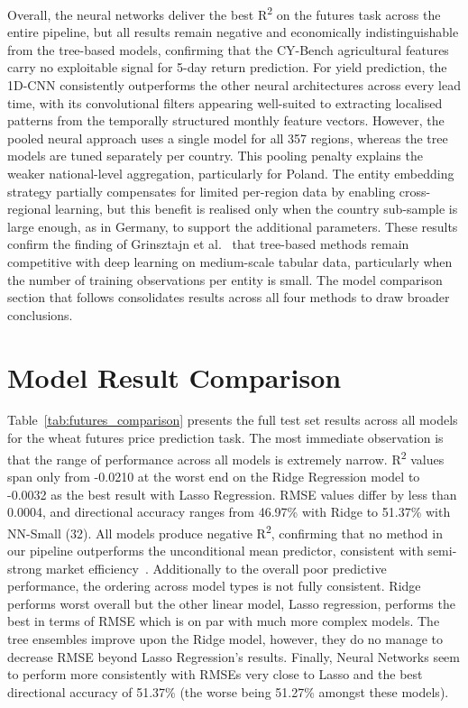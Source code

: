 \documentclass[pdflatex,sn-mathphys-num, oneside, 11pt]{sn-jnl}%
\theoremstyle{thmstyleone}%
\theoremstyle{thmstyletwo}%
\theoremstyle{thmstylethree}%
\begin{document}
Overall, the neural networks deliver the best R\textsuperscript{2} on the futures task across the entire pipeline, but all results remain negative and economically indistinguishable from the tree-based models, confirming that the CY-Bench agricultural features carry no exploitable signal for 5-day return prediction. For yield prediction, the 1D-CNN consistently outperforms the other neural architectures across every lead time, with its convolutional filters appearing well-suited to extracting localised patterns from the temporally structured monthly feature vectors. However, the pooled neural approach uses a single model for all 357 regions, whereas the tree models are tuned separately per country. This pooling penalty explains the weaker national-level aggregation, particularly for Poland. The entity embedding strategy partially compensates for limited per-region data by enabling cross-regional learning, but this benefit is realised only when the country sub-sample is large enough, as in Germany, to support the additional parameters. These results confirm the finding of Grinsztajn et al.~\cite{bib27} that tree-based methods remain competitive with deep learning on medium-scale tabular data, particularly when the number of training observations per entity is small. The model comparison section that follows consolidates results across all four methods to draw broader conclusions.\\

\section{Model Result Comparison}\label{result_comparison}

Table~\ref{tab:futures_comparison} presents the full test set results across all models for the wheat futures price prediction task. The most immediate observation is that the range of performance across all models is extremely narrow. R\textsuperscript{2} values span only from -0.0210 at the worst end on the Ridge Regression model to -0.0032 as the best result with Lasso Regression. RMSE values differ by less than 0.0004, and directional accuracy ranges from 46.97\% with Ridge to 51.37\% with NN-Small (32). All models produce negative R\textsuperscript{2}, confirming that no method in our pipeline outperforms the unconditional mean predictor, consistent with semi-strong market efficiency~\cite{bib30}. Additionally to the overall poor predictive performance, the ordering across model types is not fully consistent. Ridge performs worst overall but the other linear model, Lasso regression, performs the best in terms of RMSE which is on par with much more complex models. The tree ensembles improve upon the Ridge model, however, they do no manage to decrease RMSE beyond Lasso Regression's results. Finally, Neural Networks seem to perform more consistently with RMSEs very close to Lasso and the best directional accuracy of 51.37\% (the worse being 51.27\% amongst these models).
\end{document}
